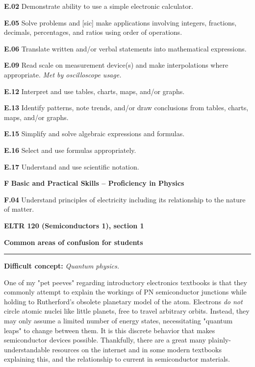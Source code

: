 \item{\bf E.02} Demonstrate ability to use a simple electronic calculator.
\item{\bf E.05} Solve problems and [sic] make applications involving integers, fractions, decimals, percentages, and ratios using order of operations.
\item{\bf E.06} Translate written and/or verbal statements into mathematical expressions.
\item{\bf E.09} Read scale on measurement device(s) and make interpolations where appropriate.  {\it Met by oscilloscope usage.}
\item{\bf E.12} Interpret and use tables, charts, maps, and/or graphs.
\item{\bf E.13} Identify patterns, note trends, and/or draw conclusions from tables, charts, maps, and/or graphs.
\item{\bf E.15} Simplify and solve algebraic expressions and formulas.
\item{\bf E.16} Select and use formulas appropriately.
\item{\bf E.17} Understand and use scientific notation.
\item{\bf F} {\bf Basic and Practical Skills -- Proficiency in Physics}
\item{\bf F.04} Understand principles of electricity including its relationship to the nature of matter.
\medskip





\vfil \eject

\centerline{\bf ELTR 120 (Semiconductors 1), section 1} \bigskip 
 
\vskip 10pt

\noindent
{\bf Common areas of confusion for students}

\vskip 5pt

\hrule \vskip 5pt

\vskip 10pt

\noindent
{\bf Difficult concept: } {\it Quantum physics.}

One of my "pet peeves" regarding introductory electronics textbooks is that they commonly attempt to explain the workings of PN semiconductor junctions while holding to Rutherford's obsolete planetary model of the atom.  Electrons {\it do not} circle atomic nuclei like little planets, free to travel arbitrary orbits.  Instead, they may only assume a limited number of energy states, necessitating "quantum leaps" to change between them.  It is this discrete behavior that makes semiconductor devices possible.  Thankfully, there are a great many plainly-understandable resources on the internet and in some modern textbooks explaining this, and the relationship to current in semiconductor materials.

